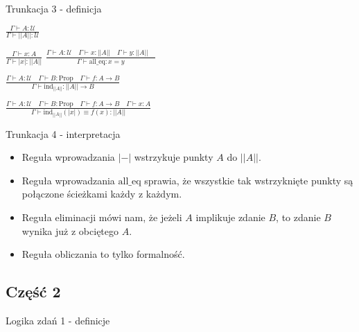 \documentclass{beamer}
\newcommand{\U}{\mathcal{U}}
\newcommand{\Prop}{\text{Prop}}
\newcommand{\trf}[1]{||#1||}
\newcommand{\tri}[1]{|#1|}
\begin{document}
\begin{frame}{Trunkacja 3 - definicja}

\begin{center}
$\displaystyle
	\frac{\Gamma \vdash A : \U}{\Gamma \vdash \trf{A} : \U}
$
\end{center}

\begin{center}
$\displaystyle
	\frac{\Gamma \vdash x : A}{\Gamma \vdash \tri{x} : \trf{A}}
$ \quad
$\displaystyle
	\frac{\Gamma \vdash A : \U	\quad
		  \Gamma \vdash x : \trf{A}	\quad
		  \Gamma \vdash y : \trf{A}	\quad
		 }
		 {\Gamma \vdash \text{all\_eq} : x = y}
$
\end{center}

\begin{center}
$\displaystyle
	\frac{\Gamma \vdash A : \U		\quad
		  \Gamma \vdash B : \Prop	\quad
		  \Gamma \vdash f : A \to B
		 }
		 {\Gamma \vdash \text{ind}_{\trf{A}} : \trf{A} \to B}
$
\end{center}

\begin{center}
$\displaystyle
\frac{\Gamma \vdash A : \U		\quad
	  \Gamma \vdash B : \Prop	\quad
	  \Gamma \vdash f : A \to B	\quad
	  \Gamma \vdash x : A
	 }
	 {\Gamma \vdash \text{ind}_{\trf{A}}(\tri{x}) \equiv f(x) : \trf{A}}
$
\end{center}

\end{frame}

\begin{frame}{Trunkacja 4 - interpretacja}
\begin{itemize}
	\item Reguła wprowadzania $\tri{-}$ wstrzykuje punkty $A$ do $\trf{A}$.
	\item Reguła wprowadzania $\text{all\_eq}$ sprawia, że wszystkie tak wstrzyknięte punkty są połączone ścieżkami każdy z każdym.
	\item Reguła eliminacji mówi nam, że jeżeli $A$ implikuje zdanie $B$, to zdanie $B$ wynika już z obciętego $A$.
	\item Reguła obliczania to tylko formalność.
\end{itemize}
\end{frame}

\subsection{Część 2}

\begin{frame}{Logika zdań 1 - definicje}

	
\end{frame}
\end{document}
